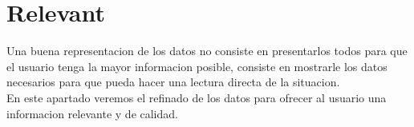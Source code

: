 \newpage
\section{Relevant}
 
Una buena representacion de los datos no consiste en presentarlos todos para que el usuario tenga la mayor informacion posible,
consiste en mostrarle los datos necesarios para que pueda hacer una lectura directa de la situacion.\\

En este apartado veremos el refinado de los datos para ofrecer al usuario una informacion relevante y de calidad.






